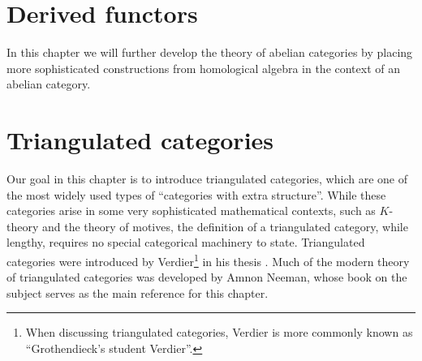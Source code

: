 \documentclass[10pt,oneside]{book}
\newcommand{\Hom}{\mathrm{Hom}}
\theoremstyle{plain}
\theoremstyle{definition}
\theoremstyle{remark}
\numberwithin{equation}{section}
\numberwithin{figure}{section}
\begin{document}
\chapter{Derived functors}

In this chapter we will further develop the theory of abelian categories by placing more sophisticated constructions from homological algebra in the context of an abelian category. 

\chapter{Triangulated categories}
Our goal in this chapter is to introduce triangulated categories, which are one of the most widely used types of ``categories with extra structure''. While these categories arise in some very sophisticated mathematical contexts, such as $K$-theory and the theory of motives, the definition of a triangulated category, while lengthy, requires no special categorical machinery to state. Triangulated categories were introduced by Verdier\footnote{When discussing triangulated categories, Verdier is more commonly known as ``Grothendieck's student Verdier''.} in his thesis \cite{verdier_thesis}. Much of the modern theory of triangulated categories was developed by Amnon Neeman, whose book on the subject \cite{neeman_triangulated} serves as the main reference for this chapter.
\end{document}
